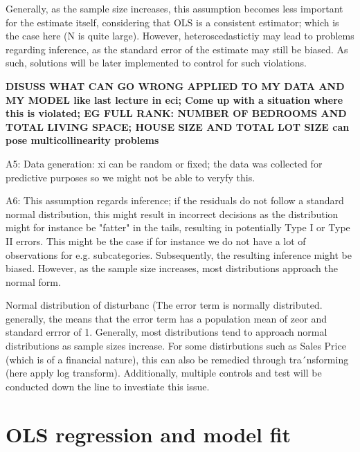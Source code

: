 \documentclass{article}
\begin{document}
Generally, as the sample size increases, this assumption becomes less important for the estimate itself, considering that OLS is a consistent estimator; which is the case here (N is quite large). However, heteroscedastictiy may lead to problems regarding inference, as the standard error of the estimate may still be biased. As such, solutions will be later implemented to control for such violations.

\textbf{DISUSS WHAT CAN GO WRONG APPLIED TO MY DATA AND MY MODEL like last lecture in eci; Come up with a situation where this is violated; EG FULL RANK: NUMBER OF BEDROOMS AND TOTAL LIVING SPACE; HOUSE SIZE AND TOTAL LOT SIZE can pose multicollinearity problems}

A5: Data generation: xi can be random or fixed; the data was collected for predictive purposes so we might not be able to veryfy this. 

A6: This assumption regards inference; if the residuals do not follow a standard normal distribution, this might result in incorrect decisions as the distribution might for instance be "fatter" in the tails, resulting in potentially Type I or Type II errors. This might be the case if for instance we do not have a lot of observations for e.g. subcategories. Subsequently, the resulting inference might be biased. However, as the sample size increases, most distributions approach the normal form. 

Normal distribution of disturbanc (The error term is normally distributed. generally, the means that the error term has a population mean of zeor and standard errror of 1. Generally, most distributions tend to approach normal distributions as sample sizes increase. For some distirbutions such as Sales Price (which is of a financial nature), this can also be remedied through tra´nsforming (here apply log transform). Additionally, multiple controls and test will be conducted down the line to investiate this issue.






\section{OLS regression and model fit}
\end{document}
